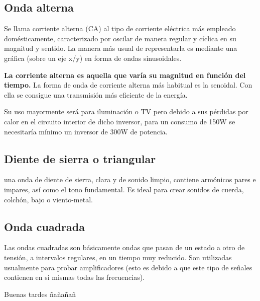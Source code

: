 \documentclass[a4paper,12pt]{article}
\begin{document}
\subsection{Onda alterna}
Se llama corriente alterna (CA) al tipo de corriente eléctrica más empleado domésticamente, caracterizado por oscilar de manera regular y cíclica en su magnitud y sentido. La manera más usual de representarla es mediante una gráfica (sobre un eje x/y) en forma de ondas sinusoidales.

\textbf{La corriente alterna es aquella que varía su magnitud en función del tiempo.} La forma de onda de corriente alterna más habitual es la senoidal. Con ella se consigue una transmisión más eficiente de la energía.

Su uso mayormente será para iluminación o TV pero debido a sus pérdidas por calor en el circuito interior de dicho inversor, para un consumo de 150W se necesitaría mínimo un inversor de 300W de potencia.

\subsection{Diente de sierra o triangular}
una onda de diente de sierra, clara y de sonido limpio, contiene armónicos pares e impares, así como el tono fundamental. Es ideal para crear sonidos de cuerda, colchón, bajo o viento-metal.
\subsection{Onda cuadrada}
Las ondas cuadradas son básicamente ondas que pasan de un estado a otro de tensión, a intervalos regulares, en un tiempo muy reducido. Son utilizadas usualmente para probar amplificadores (esto es debido a que este tipo de señales contienen en si mismas todas las frecuencias).

Buenas tardes ñañañañ
\end{document}
